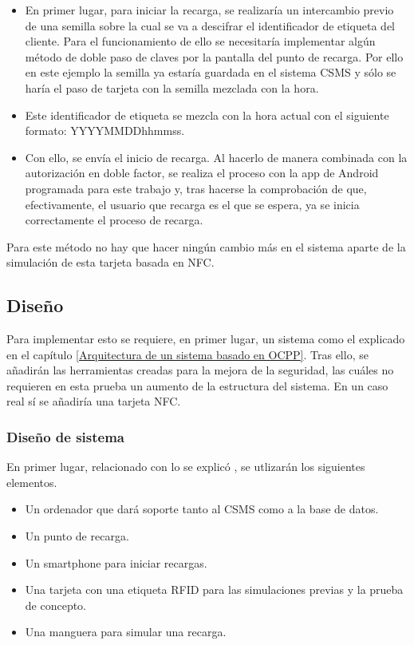 \documentclass[12pt,a4paper,onecolumn,oneside]{report}
\begin{document}
\begin{itemize}
\item En primer lugar, para iniciar la recarga, se realizaría un intercambio previo de una semilla sobre la cual se va a descifrar el identificador de etiqueta del cliente. Para el funcionamiento de ello se necesitaría implementar algún método de doble paso de claves por la pantalla del punto de recarga. Por ello en este ejemplo la semilla ya estaría guardada en el sistema CSMS y sólo se haría el paso de tarjeta con la semilla mezclada con la hora.
\item Este identificador de etiqueta se mezcla con la hora actual con el siguiente formato: YYYYMMDDhhmmss.
\item Con ello, se envía el inicio de recarga. Al hacerlo de manera combinada con la autorización en doble factor, se realiza el proceso con la app de Android programada para este trabajo y, tras hacerse la comprobación de que, efectivamente, el usuario que recarga es el que se espera, ya se inicia correctamente el proceso de recarga.
\end{itemize}

Para este método no hay que hacer ningún cambio más en el sistema aparte de la simulación de esta tarjeta basada en NFC.



\subsection{Diseño}

Para implementar esto se requiere, en primer lugar, un sistema como el explicado en el capítulo \ref{Arquitectura de un sistema basado en OCPP}. Tras ello, se añadirán las herramientas creadas para la mejora de la seguridad, las cuáles no requieren en esta prueba un aumento de la estructura del sistema. En un caso real sí se añadiría una tarjeta NFC.

\subsubsection{Diseño de sistema}

En primer lugar, relacionado con lo se explicó , se utlizarán los siguientes elementos.

\begin{itemize}
\item Un ordenador que dará soporte tanto al CSMS como a la base de datos.
\item Un punto de recarga.
\item Un smartphone para iniciar recargas.
\item Una tarjeta con una etiqueta RFID para las simulaciones previas y la prueba de concepto.
\item Una manguera para simular una recarga.
\end{itemize}
\end{document}

